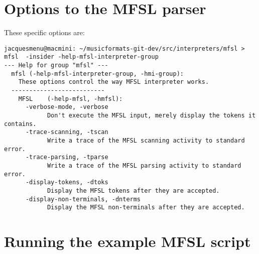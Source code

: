 \section{Options to the MFSL parser}

These specific options are:
\begin{lstlisting}[language=Terminal]
jacquesmenu@macmini: ~/musicformats-git-dev/src/interpreters/mfsl > mfsl  -insider -help-mfsl-interpreter-group
--- Help for group "mfsl" ---
  mfsl (-help-mfsl-interpreter-group, -hmi-group):
    These options control the way MFSL interpreter works.
  --------------------------
    MFSL    (-help-mfsl, -hmfsl):
      -verbose-mode, -verbose
            Don't execute the MFSL input, merely display the tokens it contains.
      -trace-scanning, -tscan
            Write a trace of the MFSL scanning activity to standard error.
      -trace-parsing, -tparse
            Write a trace of the MFSL parsing activity to standard error.
      -display-tokens, -dtoks
            Display the MFSL tokens after they are accepted.
      -display-non-terminals, -dnterms
            Display the MFSL non-terminals after they are accepted.
\end{lstlisting}


\section{Running the example MFSL script}

